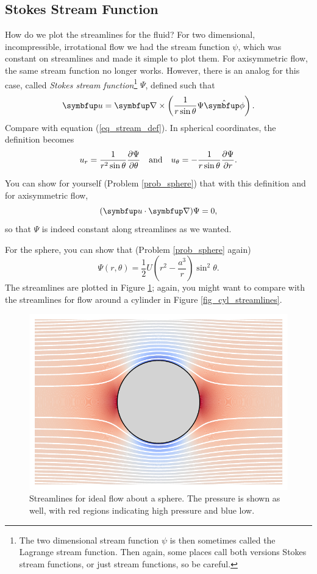 \subsection{Stokes Stream Function}

How do we plot the streamlines for the fluid?  For two dimensional, incompressible, irrotational flow we had the stream function $\psi$, which was constant on streamlines and made it simple to plot them.  For axisymmetric flow, the same stream function no longer works.  However, there is an analog for this case, called \emph{Stokes stream function}\footnote{The two dimensional stream function $\psi$ is then sometimes called the Lagrange stream function.  Then again, some places call both versions Stokes stream functions, or just stream functions, so be careful.} $\Psi$, defined such that
\begin{equation}
\vec{u} = \grad \times \left( \frac{1}{r\sin \theta} \Psi \unit{\phi} \right).
\end{equation}
Compare with equation (\ref{eq_stream_def}).  In spherical coordinates, the definition becomes
\begin{equation}
\label{eq_stokes_stream}
u_r = \frac{1}{r^2 \sin \theta} \frac{\partial {\Psi}}{\partial {\theta}} \quad \text{and} \quad u_\theta = -\frac{1}{r \sin \theta} \frac{\partial {\Psi}}{\partial {r}}.
\end{equation}

You can show for yourself (Problem \ref{prob_sphere}) that with this definition and for axisymmetric flow, 
\[
(\vec{u} \cdot \grad) \Psi = 0,
\]
so that $\Psi$ is indeed constant along streamlines as we wanted.  

For the sphere, you can show that (Problem \ref{prob_sphere} again)
\begin{equation}
\Psi (r, \theta) = \frac{1}{2} U \left( r^2 - \frac{a^3}{r} \right) \sin^2 \theta.
\end{equation}
The streamlines are plotted in Figure \ref{fig_sphere_lines}; again, you might want to compare with the streamlines for flow around a cylinder in Figure \ref{fig_cyl_streamlines}.

\begin{figure}
\centering
\includegraphics[width=0.8\linewidth]{Figures/Chapter6/fig_sphere_lines}
\caption{Streamlines for ideal flow about a sphere.  The pressure is shown as well, with red regions indicating high pressure and blue low.}
\label{fig_sphere_lines}
\end{figure}

